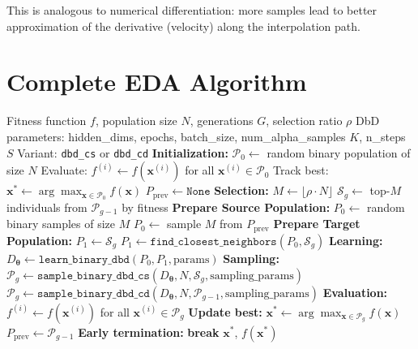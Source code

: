 \documentclass[11pt,a4paper]{article}
\newcommand{\vx}{\mathbf{x}}
\newcommand{\vtheta}{\boldsymbol{\theta}}
\begin{document}
This is analogous to numerical differentiation: more samples lead to better approximation of the derivative (velocity) along the interpolation path.

\section{Complete EDA Algorithm}

\begin{algorithm}[H]
\caption{Discrete DbD-EDA (CS/CD Variants)}
\label{alg:eda}
\begin{algorithmic}[1]
\Require Fitness function $f$, population size $N$, generations $G$, selection ratio $\rho$
\Require DbD parameters: hidden\_dims, epochs, batch\_size, num\_alpha\_samples $K$, n\_steps $S$
\Require Variant: \texttt{dbd\_cs} or \texttt{dbd\_cd}
\State
\State \textbf{Initialization:}
\State $\mathcal{P}_0 \gets$ random binary population of size $N$
\State Evaluate: $f^{(i)} \gets f(\vx^{(i)})$ for all $\vx^{(i)} \in \mathcal{P}_0$
\State Track best: $\vx^* \gets \arg\max_{\vx \in \mathcal{P}_0} f(\vx)$
\State $P_{\text{prev}} \gets \texttt{None}$
\State
{}
    \State \textbf{Selection:}
    \State $M \gets \lfloor \rho \cdot N \rfloor$
    \State $\mathcal{S}_g \gets$ top-$M$ individuals from $\mathcal{P}_{g-1}$ by fitness
    \State
    \State \textbf{Prepare Source Population:}
        \State $P_0 \gets$ random binary samples of size $M$
    \Else
        \State $P_0 \gets$ sample $M$ from $P_{\text{prev}}$
    \EndIf
    \State
    \State \textbf{Prepare Target Population:}
        \State $P_1 \gets \mathcal{S}_g$
        \State $P_1 \gets \texttt{find\_closest\_neighbors}(P_0, \mathcal{S}_g)$
    \EndIf
    \State
    \State \textbf{Learning:}
    \State $D_\vtheta \gets \texttt{learn\_binary\_dbd}(P_0, P_1, \text{params})$
    \State
    \State \textbf{Sampling:}
        \State $\mathcal{P}_g \gets \texttt{sample\_binary\_dbd\_cs}(D_\vtheta, N, \mathcal{S}_g, \text{sampling\_params})$
        \State $\mathcal{P}_g \gets \texttt{sample\_binary\_dbd\_cd}(D_\vtheta, N, \mathcal{P}_{g-1}, \text{sampling\_params})$
    \EndIf
    \State
    \State \textbf{Evaluation:}
    \State $f^{(i)} \gets f(\vx^{(i)})$ for all $\vx^{(i)} \in \mathcal{P}_g$
    \State
    \State \textbf{Update best:}
    \If{$\max_{\vx \in \mathcal{P}_g} f(\vx) > f(\vx^*)$}
        \State $\vx^* \gets \arg\max_{\vx \in \mathcal{P}_g} f(\vx)$
    \EndIf
    \State
    \State $P_{\text{prev}} \gets \mathcal{P}_{g-1}$
    \State
    \State \textbf{Early termination:}
    \If{$|f(\vx^*) - f_{\text{optimal}}| < \epsilon$}
        \State \textbf{break}
    \EndIf
\EndFor
\State \Return $\vx^*$, $f(\vx^*)$
\end{algorithmic}
\end{algorithm}
\end{document}
